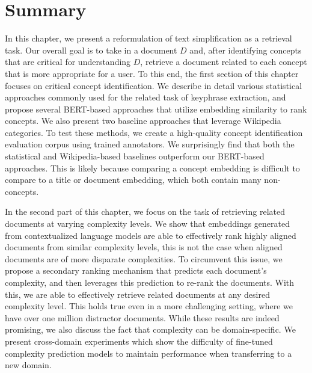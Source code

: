 \documentclass[thesis.tex]{subfiles}
\begin{document}
\section{Summary}

In this chapter, we present a reformulation of text simplification as a retrieval task. Our overall goal is to take in a document $D$ and, after identifying concepts that are critical for understanding $D$, retrieve a document related to each concept that is more appropriate for a user. To this end, the first section of this chapter focuses on critical concept identification. We describe in detail various statistical approaches commonly used for the related task of keyphrase extraction, and propose several BERT-based approaches that utilize embedding similarity to rank concepts. We also present two baseline approaches that leverage Wikipedia categories. To test these methods, we create a high-quality concept identification evaluation corpus using trained annotators. We surprisingly find that both the statistical and Wikipedia-based baselines outperform our BERT-based approaches. This is likely because comparing a concept embedding is difficult to compare to a title or document embedding, which both contain many non-concepts.

In the second part of this chapter, we focus on the task of retrieving related documents at varying complexity levels. We show that embeddings generated from contextualized language models are able to effectively rank highly aligned documents from similar complexity levels, this is not the case when aligned documents are of more disparate complexities. To circumvent this issue, we propose a secondary ranking mechanism that predicts each document's complexity, and then leverages this prediction to re-rank the documents. With this, we are able to effectively retrieve related documents at any desired complexity level. This holds true even in a more challenging setting, where we have over one million distractor documents. While these results are indeed promising, we also discuss the fact that complexity can be domain-specific. We present cross-domain experiments which show the difficulty of fine-tuned complexity prediction models to maintain performance when transferring to a new domain.

\biblio
\end{document}
